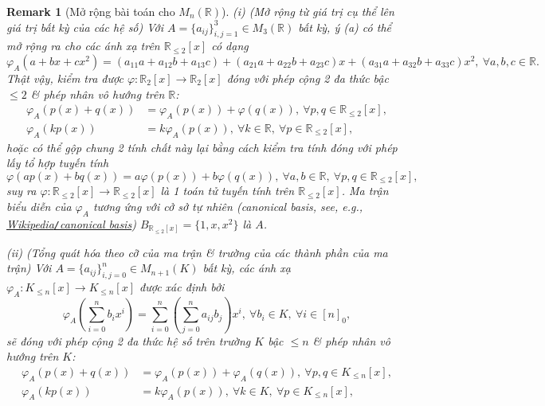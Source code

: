 \documentclass{article}
\newtheorem{remark}{Remark}
\begin{document}
\begin{remark}[Mở rộng bài toán cho $M_n(\mathbb{R})$]
	(i) {\rm(Mở rộng từ giá trị cụ thể lên giá trị bất kỳ của các hệ số)} Với $A = \{a_{ij}\}_{i,j=1}^3\in M_3(\mathbb{R})$ bất kỳ, ý (a) có thể mở rộng ra cho các ánh xạ trên $\mathbb{R}_{\le2}[x]$ có dạng
	\begin{equation*}
		\varphi_A(a + bx + cx^2) = (a_{11}a + a_{12}b + a_{13}c) + (a_{21}a + a_{22}b + a_{23}c)x + (a_{31}a + a_{32}b + a_{33}c)x^2,\ \forall a,b,c\in\mathbb{R}.
	\end{equation*}
	Thật vậy, kiểm tra được $\varphi:\mathbb{R}_2[x]\to\mathbb{R}_2[x]$ đóng với phép cộng 2 đa thức bậc $\le2$ \& phép nhân vô hướng trên $\mathbb{R}$:
	\begin{align*}
		\varphi_A(p(x) + q(x)) &= \varphi_A(p(x)) + \varphi(q(x)),\ \forall p,q\in\mathbb{R}_{\le2}[x],\\
		\varphi_A(kp(x)) &= k\varphi_A(p(x)),\ \forall k\in\mathbb{R},\ \forall p\in\mathbb{R}_{\le2}[x],
	\end{align*}
	hoặc có thể gộp chung 2 tính chất này lại bằng cách kiểm tra tính đóng với phép lấy tổ hợp tuyến tính
	\begin{equation*}
		\varphi(ap(x) + bq(x)) = a\varphi(p(x)) + b\varphi(q(x)),\ \forall a,b\in\mathbb{R},\ \forall p,q\in\mathbb{R}_{\le2}[x],
	\end{equation*}
	suy ra $\varphi:\mathbb{R}_{\le2}[x]\to\mathbb{R}_{\le2}[x]$ là 1 toán tử tuyến tính trên $\mathbb{R}_{\le2}[x]$. Ma trận biểu diễn của $\varphi_A$ tương ứng với cở sở tự nhiên (canonical basis, see, e.g., \href{https://en.wikipedia.org/wiki/Canonical_basis}{Wikipedia{\tt/}canonical basis}) $B_{\mathbb{R}_{\le2}[x]} = \{1,x,x^2\}$ là $A$.
	\item(ii) {\rm(Tổng quát hóa theo cỡ của ma trận \& trường của các thành phần của ma trận)}  Với $A = \{a_{ij}\}_{i,j=0}^n\in M_{n+1}(K)$ bất kỳ, các ánh xạ $\varphi_A:K_{\le n}[x]\to K_{\le n}[x]$ được xác định bởi
	\begin{equation*}
		\varphi_A\left(\sum_{i=0}^n b_ix^i\right) = \sum_{i=0}^n \left(\sum_{j=0}^n a_{ij}b_j\right)x^i,\ \forall b_i\in K,\ \forall i\in[n]_0,
	\end{equation*}
	sẽ đóng với phép cộng 2 đa thức hệ số trên trường $K$ bậc $\le n$ \& phép nhân vô hướng trên $K$:
	\begin{align*}
		\varphi_A(p(x) + q(x)) &= \varphi_A(p(x)) + \varphi_A(q(x)),\ \forall p,q\in K_{\le n}[x],\\
		\varphi_A(kp(x)) &= k\varphi_A(p(x)),\ \forall k\in K,\ \forall p\in K_{\le n}[x],

\end{align*}
\end{remark}
\end{document}
